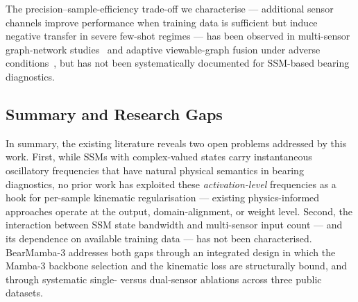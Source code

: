 The precision--sample-efficiency trade-off we characterise
— additional sensor channels improve performance when training data is
sufficient but induce negative transfer in severe few-shot regimes
— has been observed in multi-sensor graph-network studies~\cite{fusion_graph}
and adaptive viewable-graph fusion under adverse conditions~\cite{multisensor_tradeoff},
but has not been systematically documented for SSM-based bearing diagnostics.

\subsection*{Summary and Research Gaps}
\label{subsec:gaps}

In summary, the existing literature reveals two open problems addressed
by this work.
First, while SSMs with complex-valued states carry instantaneous oscillatory
frequencies that have natural physical semantics in bearing diagnostics,
no prior work has exploited these \emph{activation-level} frequencies as
a hook for per-sample kinematic regularisation — existing physics-informed
approaches operate at the output, domain-alignment, or weight level.
Second, the interaction between SSM state bandwidth and multi-sensor input
count — and its dependence on available training data — has not been
characterised.
BearMamba-3 addresses both gaps through an integrated design in which the
Mamba-3 backbone selection and the kinematic loss are structurally bound,
and through systematic single- versus dual-sensor ablations across three
public datasets.
